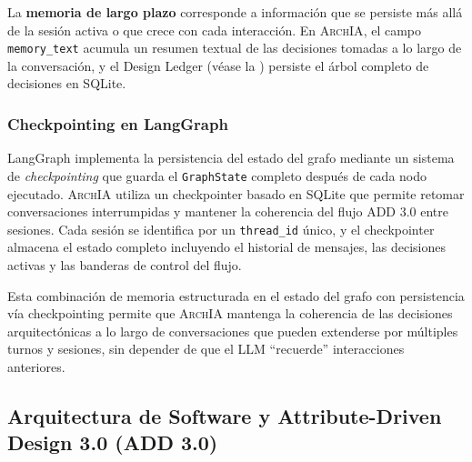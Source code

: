 \documentclass[12pt, letterpaper, oneside]{article}
\newcommand{\archia}{\textsc{ArchIA}}
\begin{document}
La \textbf{memoria de largo plazo} corresponde a información que se persiste más
allá de la sesión activa o que crece con cada interacción. En \archia{}, el campo
\texttt{memory\_text} acumula un resumen textual de las decisiones tomadas a lo
largo de la conversación, y el Design Ledger (véase la )
persiste el árbol completo de decisiones en SQLite.

\subsubsection{Checkpointing en LangGraph}

LangGraph implementa la persistencia del estado del grafo mediante un sistema de
\emph{checkpointing} que guarda el \texttt{GraphState} completo después de cada
nodo ejecutado. \archia{} utiliza un checkpointer basado en SQLite que permite
retomar conversaciones interrumpidas y mantener la coherencia del flujo ADD 3.0
entre sesiones. Cada sesión se identifica por un \texttt{thread\_id} único, y el
checkpointer almacena el estado completo incluyendo el historial de mensajes, las
decisiones activas y las banderas de control del flujo.

Esta combinación de memoria estructurada en el estado del grafo con persistencia
vía checkpointing permite que \archia{} mantenga la coherencia de las decisiones
arquitectónicas a lo largo de conversaciones que pueden extenderse por múltiples
turnos y sesiones, sin depender de que el LLM ``recuerde'' interacciones
anteriores.


\subsection{Arquitectura de Software y Attribute-Driven Design 3.0 (ADD 3.0)}
\label{subsec:add3}
\end{document}
